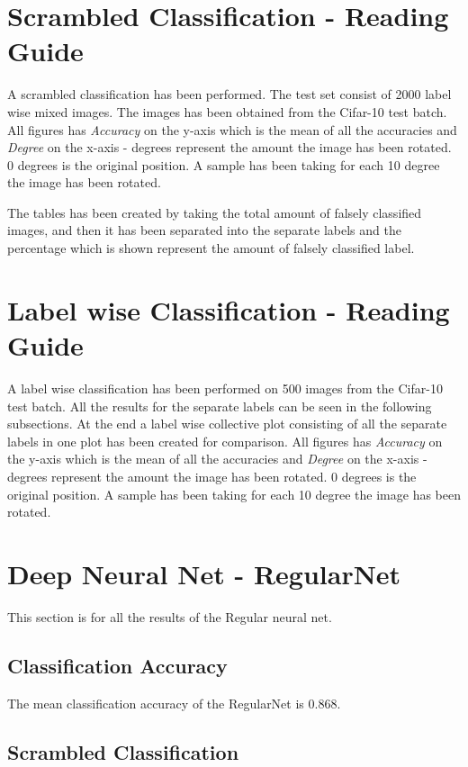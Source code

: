 \section{Scrambled Classification - Reading Guide}
A scrambled classification has been performed. The test set consist of 2000 label wise mixed images. The images has been obtained from the Cifar-10 test batch.
All figures has \emph{Accuracy} on the y-axis which is the mean of all the accuracies and \emph{Degree} on the x-axis - degrees represent the amount the image has been rotated. 0 degrees is the original position. A sample has been taking for each 10 degree the image has been rotated.

The tables has been created by taking the total amount of falsely classified images, and then it has been separated into the separate labels and the percentage which is shown represent the amount of falsely classified label.

\section{Label wise Classification - Reading Guide}
A label wise classification has been performed on 500 images from the Cifar-10 test batch. All the results for the separate labels can be seen in the following subsections. At the end a label wise collective plot consisting of all the separate labels in one plot has been created for comparison.
All figures has \emph{Accuracy} on the y-axis which is the mean of all the accuracies and \emph{Degree} on the x-axis - degrees represent the amount the image has been rotated. 0 degrees is the original position. A sample has been taking for each 10 degree the image has been rotated.

\section{Deep Neural Net - RegularNet}
This section is for all the results of the Regular neural net.

\subsection{Classification Accuracy}
The mean classification accuracy of the RegularNet is 0.868.
\FloatBarrier
\subsection{Scrambled Classification}
\FloatBarrier

